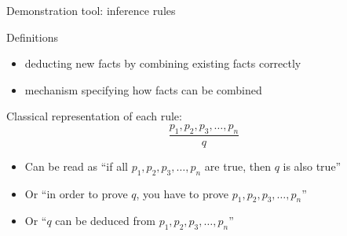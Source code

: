 \begin{frame}{Demonstration tool: inference rules}
  \begin{block}{Definitions}
    \begin{itemize}
    \item {} deducting new facts by combining existing
      facts correctly
    \item {} mechanism specifying how facts can be
      combined
    \end{itemize}
  \end{block}

  \begin{block}{Classical representation of each rule:}
    $$\frac{p_1, p_2, p_3, \ldots, p_n}{q}$$
    \begin{itemize}
    \item Can be read as ``if all $p_1, p_2, p_3, \ldots, p_n$ are true, then
      $q$ is also true''
    \item Or ``in order to prove $q$, you have to prove $p_1, p_2, p_3, \ldots,
      p_n$'' 
    \item Or ``$q$ can be deduced from $p_1, p_2, p_3, \ldots, p_n$''
    \end{itemize}
  \end{block}
\end{frame}
